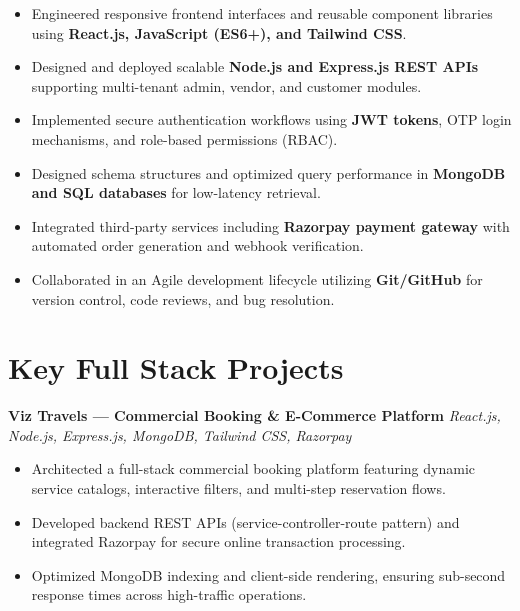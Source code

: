 \documentclass[a4paper,10pt]{article}
\begin{document}
\begin{itemize}

    \item Engineered responsive frontend interfaces and reusable component libraries using \textbf{React.js, JavaScript (ES6+), and Tailwind CSS}.

    \item Designed and deployed scalable \textbf{Node.js and Express.js REST APIs} supporting multi-tenant admin, vendor, and customer modules.

    \item Implemented secure authentication workflows using \textbf{JWT tokens}, OTP login mechanisms, and role-based permissions (RBAC).

    \item Designed schema structures and optimized query performance in \textbf{MongoDB and SQL databases} for low-latency retrieval.

    \item Integrated third-party services including \textbf{Razorpay payment gateway} with automated order generation and webhook verification.

    \item Collaborated in an Agile development lifecycle utilizing \textbf{Git/GitHub} for version control, code reviews, and bug resolution.

\end{itemize}

\section*{Key Full Stack Projects}

\textbf{Viz Travels --- Commercial Booking \& E-Commerce Platform}
\hfill
\textit{React.js, Node.js, Express.js, MongoDB, Tailwind CSS, Razorpay}

\begin{itemize}

    \item Architected a full-stack commercial booking platform featuring dynamic service catalogs, interactive filters, and multi-step reservation flows.

    \item Developed backend REST APIs (service-controller-route pattern) and integrated Razorpay for secure online transaction processing.

    \item Optimized MongoDB indexing and client-side rendering, ensuring sub-second response times across high-traffic operations.

\end{itemize}
\end{document}
